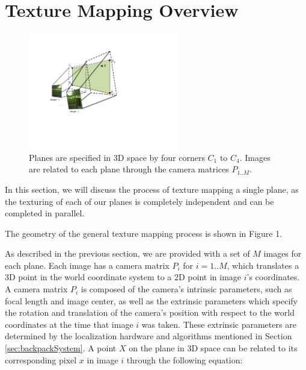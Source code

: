 \documentclass[10pt,twocolumn,letterpaper]{article}
\begin{document}
\section{Texture Mapping Overview}
\label{sec:textureMappingOverview}

\begin{figure}
  \centering
  \includegraphics[height=2in]{Projection.pdf}
  \caption{Planes are specified in 3D space by four corners $C_1$ to
    $C_4$. Images are related to each plane through the camera
    matrices $P_{1..M}$. }
  \label{fig:projection}
\end{figure}

In this section, we will discuss the process of texture mapping a
single plane, as the texturing of each of our planes is completely
independent and can be completed in parallel.  

The geometry of the general texture mapping process is shown in Figure 1. 

 As
described in the previous section, we are provided with a set of $M$
images for each plane. Each image has a camera matrix $P_i$ for $i=1..M$, which
translates a 3D point in the world coordinate system to a 2D point in
image $i$'s coordinates. A camera matrix $P_i$ is composed of the
camera's intrinsic parameters, such as focal length and image center,
as well as the extrinsic parameters which specify the rotation and
translation of the camera's position with respect to the world
coordinates at the time that image $i$ was taken. These extrinsic
parameters are determined by the localization hardware and algorithms
mentioned in Section \ref{sec:backpackSystem}. A point $X$ on the
plane in 3D space can be related to its corresponding pixel $x$ in image $i$
through the following equation:
\end{document}
